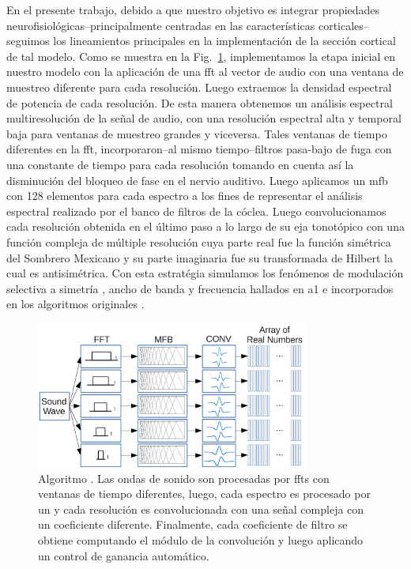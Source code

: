 {En el presente trabajo, debido a que nuestro objetivo es integrar propiedades neurofisiológicas--principalmente centradas en las características corticales--seguimos
los lineamientos principales en la implementación de la sección cortical de tal modelo.
Como se muestra en la Fig.~\ref{fig:MRSTSA}, implementamos la etapa inicial en nuestro modelo con la aplicación de una \gls{fft} al vector de audio
con una ventana de muestreo diferente para cada resolución.
Luego extraemos la densidad espectral de potencia de cada resolución.
De esta manera obtenemos un análisis espectral multiresolución de la señal de audio,
con una resolución espectral alta y temporal baja para ventanas de muestreo grandes y
viceversa.
Tales ventanas de tiempo diferentes en la \gls{fft},
incorporaron--al mismo tiempo--filtros pasa-bajo de fuga con una constante de tiempo para cada
resolución tomando en cuenta así la disminución del bloqueo de fase en el nervio auditivo. 
Luego aplicamos un \gls{mfb} con 128 elementos para cada espectro
a los fines de representar el análisis espectral realizado por el banco de filtros de la cóclea.
Luego convolucionamos cada resolución obtenida en el último paso a lo largo de su eja tonotópico
con una función compleja de múltiple resolución cuya parte real
fue la función simétrica del Sombrero Mexicano y su parte imaginaria fue su transformada de Hilbert la cual es antisimétrica.
Con esta estratégia simulamos los fenómenos de modulación selectiva a simetría \cite{shamma_1993}, ancho de banda \cite{schreiner_1990}
y frecuencia \cite{shamma_1993,heil_1992,mendelson_1985}
hallados en \gls{a1} e incorporados en los algoritmos originales \cite{wang_1995}.

\begin{figure}[h!]
    \centering
    \includegraphics[width=0.8\textwidth]{MRSTSA.png}
    \caption{Algoritmo . Las ondas de sonido son procesadas por \glspl{fft} con ventanas de tiempo diferentes, luego, cada espectro es procesado por
	    un  y cada resolución es convolucionada con una señal compleja con un coeficiente diferente. Finalmente, cada coeficiente de filtro
	    se obtiene computando el módulo de la convolución y luego aplicando un control de ganancia automático.}
    \label{fig:MRSTSA}
\end{figure}

}
